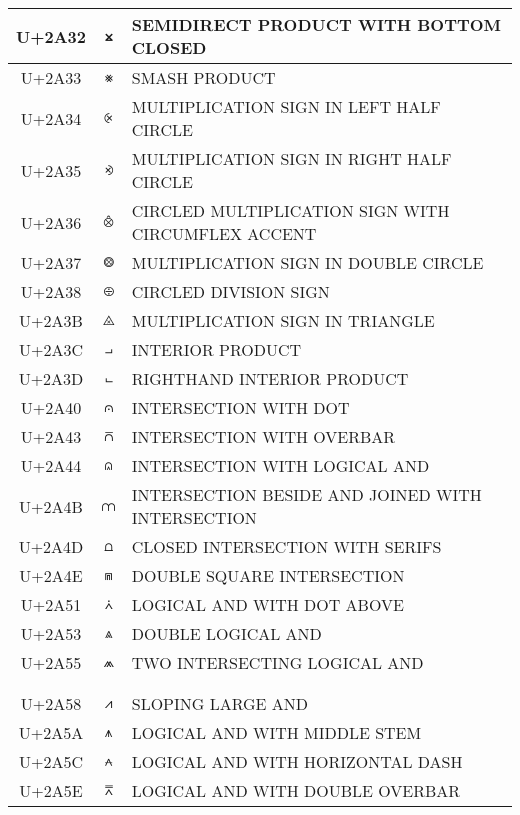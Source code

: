 \documentclass[a4paper]{article}
\begin{document}
\begin{longtable}{ccl}
  U+2A32 & \texttt{⨲}  & SEMIDIRECT PRODUCT WITH BOTTOM CLOSED \\ \hline
  U+2A33 & \texttt{⨳}  & SMASH PRODUCT \\ \hline
  U+2A34 & \texttt{⨴}  & MULTIPLICATION SIGN IN LEFT HALF CIRCLE \\ \hline
  U+2A35 & \texttt{⨵}  & MULTIPLICATION SIGN IN RIGHT HALF CIRCLE \\ \hline
  U+2A36 & \texttt{⨶}  & CIRCLED MULTIPLICATION SIGN WITH CIRCUMFLEX ACCENT \\ \hline
  U+2A37 & \texttt{⨷}  & MULTIPLICATION SIGN IN DOUBLE CIRCLE \\ \hline
  U+2A38 & \texttt{⨸}  & CIRCLED DIVISION SIGN \\ \hline
  U+2A3B & \texttt{⨻}  & MULTIPLICATION SIGN IN TRIANGLE \\ \hline
  U+2A3C & \texttt{⨼}  & INTERIOR PRODUCT \\ \hline
  U+2A3D & \texttt{⨽}  & RIGHTHAND INTERIOR PRODUCT \\ \hline
  U+2A40 & \texttt{⩀}  & INTERSECTION WITH DOT \\ \hline
  U+2A43 & \texttt{⩃}  & INTERSECTION WITH OVERBAR \\ \hline
  U+2A44 & \texttt{⩄}  & INTERSECTION WITH LOGICAL AND \\ \hline
  U+2A4B & \texttt{⩋}  & INTERSECTION BESIDE AND JOINED WITH INTERSECTION \\ \hline
  U+2A4D & \texttt{⩍}  & CLOSED INTERSECTION WITH SERIFS \\ \hline
  U+2A4E & \texttt{⩎}  & DOUBLE SQUARE INTERSECTION \\ \hline
  U+2A51 & \texttt{⩑}  & LOGICAL AND WITH DOT ABOVE \\ \hline
  U+2A53 & \texttt{⩓}  & DOUBLE LOGICAL AND \\ \hline
  U+2A55 & \texttt{⩕}  & TWO INTERSECTING LOGICAL AND \\ \hline
 \\ \hline
 \\ \hline
  U+2A58 & \texttt{⩘}  & SLOPING LARGE AND \\ \hline
  U+2A5A & \texttt{⩚}  & LOGICAL AND WITH MIDDLE STEM \\ \hline
  U+2A5C & \texttt{⩜}  & LOGICAL AND WITH HORIZONTAL DASH \\ \hline
  U+2A5E & \texttt{⩞}  & LOGICAL AND WITH DOUBLE OVERBAR \\ \hline

\end{longtable}
\end{document}

